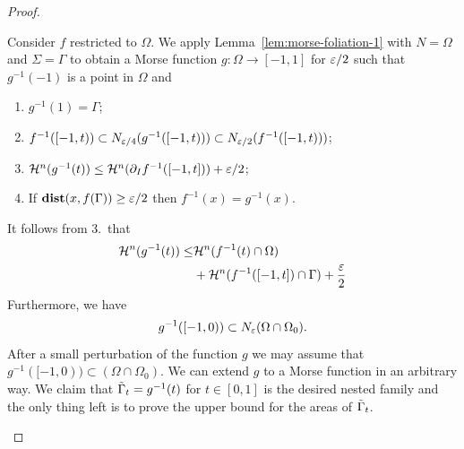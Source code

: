 \begin{lemma}
\begin{proof}
\begin{itemize}
            Consider $f$ restricted to $\Omega$. We apply Lemma~\ref{lem:morse-foliation-1} with $N = \Omega$ and $\Sigma = \Gamma$ to obtain a Morse function $g: \Omega \to [-1, 1]$ for $\varepsilon/2$ such that $g^{-1}(-1)$ is a point in $\Omega$ and
            \begin{enumerate}
                \item $g^{-1}(1) = \Gamma$;
                \item $f^{-1}([-1, t)) \subset N_{\varepsilon/4}(g^{-1}([-1, t))) \subset N_{\varepsilon/2}(f^{-1}([-1, t)))$;
                \item $\mathcal{H}^n(g^{-1}(t)) \leq \mathcal{H}^n(\partial_I f^{-1}([-1, t])) + \varepsilon/2$;
                \item If $\mathbf{dist}(x, f(\Gamma)) \geq \varepsilon/2$ then $f^{-1}(x) = g^{-1}(x)$.
            \end{enumerate}
            It follows from 3.\ that
            \begin{equation*}
                \begin{split}
                    \mathcal{H}^n(g^{-1}(t)) \leq& \mathcal{H}^n(f^{-1}(t)\cap \Omega)\\
                    &+ \mathcal{H}^n(f^{-1}([-1, t])\cap \Gamma) + \frac{\varepsilon}{2}
                \end{split}
            \end{equation*}
            Furthermore, we have
            \begin{equation*}
                g^{-1}([-1, 0)) \subset N_\varepsilon(\Omega\cap \Omega_0).
            \end{equation*}
            After a small perturbation of the function $g$ we may assume that $g^{-1}([-1, 0)) \subset (\Omega\cap\Omega_0)$. We can extend $g$ to a Morse function in an arbitrary way. We claim that $\Tilde{\Gamma}_t = g^{-1}(t)$ for $t \in [0, 1]$ is the desired nested family and the only thing left is to prove the upper bound for the areas of $\Tilde{\Gamma}_t$.


\end{itemize}
\end{proof}
\end{lemma}
